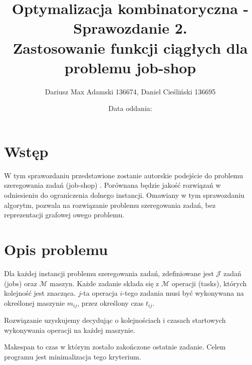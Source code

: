\documentclass[11pt,twocolumn]{article}
\title{Optymalizacja kombinatoryczna - Sprawozdanie 2. \\ Zastosowanie funkcji ciągłych dla problemu job-shop}
\author{Dariusz Max Adamski 136674, Daniel Cieśliński 136695}
\affil{\{dariusz.adamski,daniel.cieslinski\}@student.put.poznan.pl}
\date{Data oddania:}
\begin{document}
\maketitle


\section*{Wstęp}

W tym sprawozdaniu przedstawione zostanie autorskie podejście do problemu szeregowania zadań (job-shop) \cite{ortools}.
Porównana będzie jakość rozwiązań w odniesieniu do ograniczenia dolnego instancji.
Omawiany w tym sprawozdaniu algorytm, pozwala na rozwiązanie problemu szeregowania zadań, bez reprezentacji grafowej owego problemu.


\section{Opis problemu}

Dla każdej instancji problemu szeregowania zadań,
zdefiniowane jest $\mathcal{J}$ zadań (jobs) oraz $\mathcal{M}$ maszyn.
Każde zadanie składa się z $\mathcal{M}$ operacji (tasks),
których kolejność jest znacząca.
$j$-ta operacja $i$-tego zadania musi być wykonywana na określonej maszynie $m_{ij}$,
przez określony czas $t_{ij}$.

Rozwiązanie uzyskujemy decydując o kolejnościach i
czasach startowych wykonywania operacji na każdej maszynie.

Makespan to czas w którym zostało zakończone ostatnie zadanie.
Celem programu jest minimalizacja tego kryterium.
\end{document}
